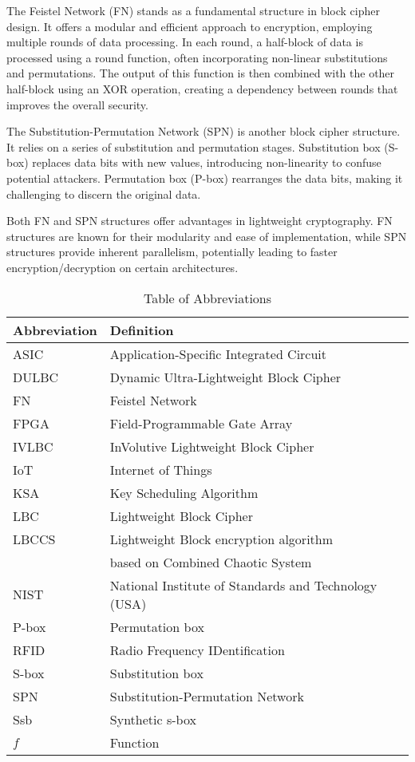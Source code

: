 \documentclass[conference]{IEEEtran}
\begin{document}
The Feistel Network (FN) stands as a fundamental structure in block cipher design. It offers a modular and efficient approach to encryption, employing multiple rounds of data processing. In each round, a half-block of data is processed using a round function, often incorporating non-linear substitutions and permutations. The output of this function is then combined with the other half-block using an XOR operation, creating a dependency between rounds that improves the overall security\cite{FEISTEL}.

The Substitution-Permutation Network (SPN) is another block cipher structure. It relies on a series of substitution and permutation stages. Substitution box (S-box) replaces data bits with new values, introducing non-linearity to confuse potential attackers. Permutation box (P-box) rearranges the data bits, making it challenging to discern the original data\cite{heys1996substitution}.

Both FN and SPN structures offer advantages in lightweight cryptography. FN structures are known for their modularity and ease of implementation, while SPN structures provide inherent parallelism, potentially leading to faster encryption/decryption on certain architectures.

\begin{table}[ht]
    \centering
    \caption{Table of Abbreviations}
    \begin{tabular}{ll}
        \toprule
        \textbf{Abbreviation} & \textbf{Definition} \\
        \midrule
        ASIC & Application-Specific Integrated Circuit \\
        DULBC & Dynamic Ultra-Lightweight Block Cipher \\
        FN & Feistel Network \\
        FPGA & Field-Programmable Gate Array \\
        IVLBC & InVolutive Lightweight Block Cipher \\
        IoT & Internet of Things \\
        KSA & Key Scheduling Algorithm \\
        LBC & Lightweight Block Cipher \\
        LBCCS & Lightweight Block encryption algorithm \\
        & based on Combined Chaotic System \\
        NIST & National Institute of Standards and Technology (USA) \\
        P-box & Permutation box \\
        RFID & Radio Frequency IDentification \\
        S-box & Substitution box \\
        SPN & Substitution-Permutation Network \\
        Ssb & Synthetic s-box \\
        $f$ & Function \\
        \bottomrule
    \end{tabular}
    \label{table:abbreviations}
\end{table}
\end{document}
